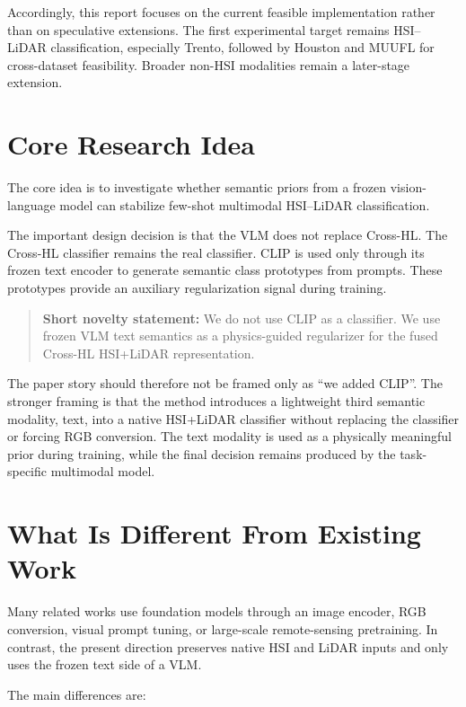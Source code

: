 \documentclass[10pt,journal,compsoc]{IEEEtran}
\begin{document}
Accordingly, this report focuses on the current feasible implementation rather than on speculative extensions. The first experimental target remains HSI--LiDAR classification, especially Trento, followed by Houston and MUUFL for cross-dataset feasibility. Broader non-HSI modalities remain a later-stage extension.

\section{Core Research Idea}

The core idea is to investigate whether semantic priors from a frozen vision-language model can stabilize few-shot multimodal HSI--LiDAR classification.

The important design decision is that the VLM does not replace Cross-HL. The Cross-HL classifier remains the real classifier. CLIP is used only through its frozen text encoder to generate semantic class prototypes from prompts. These prototypes provide an auxiliary regularization signal during training.

\begin{quote}
\textbf{Short novelty statement:} We do not use CLIP as a classifier. We use frozen VLM text semantics as a physics-guided regularizer for the fused Cross-HL HSI+LiDAR representation.
\end{quote}

The paper story should therefore not be framed only as ``we added CLIP''. The stronger framing is that the method introduces a lightweight third semantic modality, text, into a native HSI+LiDAR classifier without replacing the classifier or forcing RGB conversion. The text modality is used as a physically meaningful prior during training, while the final decision remains produced by the task-specific multimodal model.

\section{What Is Different From Existing Work}

Many related works use foundation models through an image encoder, RGB conversion, visual prompt tuning, or large-scale remote-sensing pretraining. In contrast, the present direction preserves native HSI and LiDAR inputs and only uses the frozen text side of a VLM.

The main differences are:
\end{document}
